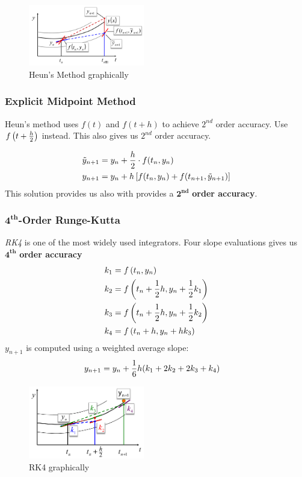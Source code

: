 \begin{multicols}{2}
\begin{figure}[H]
	\centering
	\includegraphics[width=0.45\textwidth]{img/01_heun}
	\caption{Heun's Method graphically}
\end{figure}

\subsubsection{Explicit Midpoint Method}
Heun's method uses $f(t)$ and $f(t+h)$ to achieve $2^{nd}$ order accuracy. Use $f\left(t+{h\over 2} \right)$ instead. This also gives us $2^{nd}$ order accuracy.

\begin{align*}
	\tilde y_{n+1} &= y_n + {h \over 2}\cdot f(t_n, y_n) \\
	y_{n+1} &= y_n + h \left[ f(t_n, y_n) + f(t_{n+1}, \tilde y_{n+1}) \right]
\end{align*}
This solution provides us also with provides a $\mathbf{2^{nd}}$ \textbf{order accuracy}.

\subsubsection{$\mathbf{4^{th}}$-Order Runge-Kutta}
\emph{RK4} is one of the most widely used integrators. Four slope evaluations gives us $\mathbf{4^{th}}$ \textbf{order accuracy}
\begin{align*}
	k_1 &= f\left(t_n, y_n\right)\\
	k_2 &= f\left(t_n+{1\over 2}h, y_n+{1\over 2}k_1\right)\\
	k_3 &= f\left(t_n+{1\over 2}h, y_n+{1\over 2}k_2\right)\\
	k_4 &= f\left(t_n+h, y_n + h k_3\right)
\end{align*}
$y_{n+1}$ is computed using a weighted average slope:
\begin{align*}
	y_{n+1} &= y_n + {1 \over 6}h (k_1 + 2k_2 + 2k_3+k_4)
\end{align*}
\begin{figure}[H]
	\centering
	\includegraphics[width=0.45\textwidth]{img/01_rk4}
	\caption{RK4 graphically}
\end{figure}


\end{multicols}
